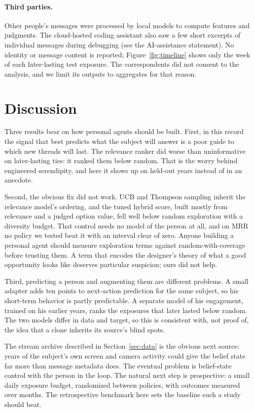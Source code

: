 \documentclass[11pt]{article}
\begin{document}
\paragraph{Third parties.} Other people's messages were processed by local models to compute features and judgments. The cloud-hosted coding assistant also saw a few short excerpts of individual messages during debugging (see the AI-assistance statement). No identity or message content is reported; Figure~\ref{fig:timeline} shows only the week of each later-lasting test exposure. The correspondents did not consent to the analysis, and we limit its outputs to aggregates for that reason.

\section{Discussion}

Three results bear on how personal agents should be built. First, in this record the signal that best predicts what the subject will answer is a poor guide to which new threads will last. The relevance ranker did worse than uninformative on later-lasting ties: it ranked them below random. That is the worry behind engineered serendipity, and here it shows up on held-out years instead of in an anecdote.

Second, the obvious fix did not work. UCB and Thompson sampling inherit the relevance model's ordering, and the tuned hybrid score, built mostly from relevance and a judged option value, fell well below random exploration with a diversity budget. That control needs no model of the person at all, and on MRR no policy we tested beat it with an interval clear of zero. Anyone building a personal agent should measure exploration terms against random-with-coverage before trusting them. A term that encodes the designer's theory of what a good opportunity looks like deserves particular suspicion; ours did not help.

Third, predicting a person and augmenting them are different problems. A small adapter adds ten points to next-action prediction for the same subject, so his short-term behavior is partly predictable. A separate model of his engagement, trained on his earlier years, ranks the exposures that later lasted below random. The two models differ in data and target, so this is consistent with, not proof of, the idea that a clone inherits its source's blind spots.

The stream archive described in Section~\ref{sec:data} is the obvious next source: years of the subject's own screen and camera activity could give the belief state far more than message metadata does. The eventual problem is belief-state control with the person in the loop. The natural next step is prospective: a small daily exposure budget, randomized between policies, with outcomes measured over months. The retrospective benchmark here sets the baseline such a study should beat.
\end{document}

